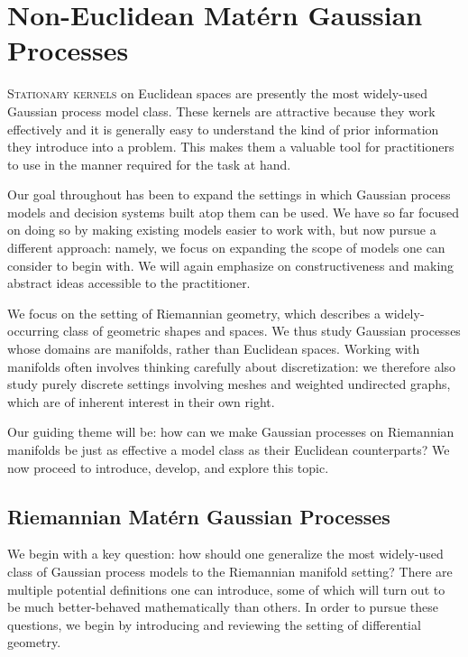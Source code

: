 \documentclass[11pt]{book}
\begin{document}
\chapter{Non-Euclidean Matérn Gaussian Processes}
\label{ch:noneuclidean}

\lettrine{S}{tationary kernels} on Euclidean spaces are presently the most widely-used Gaussian process model class.
These kernels are attractive because they work effectively and it is generally easy to understand the kind of prior information they introduce into a problem.
This makes them a valuable tool for practitioners to use in the manner required for the task at hand.

Our goal throughout has been to expand the settings in which Gaussian process models and decision systems built atop them can be used.
We have so far focused on doing so by making existing models easier to work with, but now pursue a different approach: namely, we focus on expanding the scope of models one can consider to begin with.
We will again emphasize on constructiveness and making abstract ideas accessible to the practitioner.

We focus on the setting of Riemannian geometry, which describes a widely-occurring class of geometric shapes and spaces.
We thus study Gaussian processes whose domains are manifolds, rather than Euclidean spaces.
Working with manifolds often involves thinking carefully about discretization: we therefore also study purely discrete settings involving meshes and weighted undirected graphs, which are of inherent interest in their own right.

Our guiding theme will be: how can we make Gaussian processes on Riemannian manifolds be just as effective a model class as their Euclidean counterparts?
We now proceed to introduce, develop, and explore this topic.


\section{Riemannian Matérn Gaussian Processes}

We begin with a key question: how should one generalize the most widely-used class of Gaussian process models to the Riemannian manifold setting?
There are multiple potential definitions one can introduce, some of which will turn out to be much better-behaved mathematically than others.
In order to pursue these questions, we begin by introducing and reviewing the setting of differential geometry.
\end{document}
